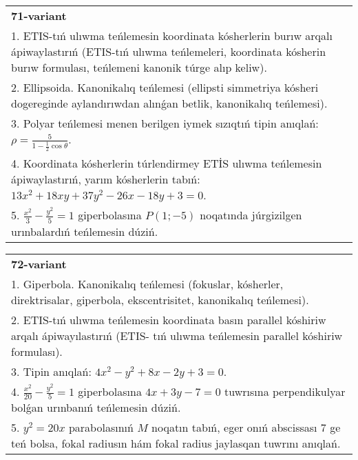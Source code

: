\documentclass{article}
\begin{document}
\begin{tabular}{m{17cm}}
\textbf{71-variant}\\
1. ETIS-tıń ulıwma teńlemesin koordinata kósherlerin burıw arqalı ápiwaylastırıń (ETIS-tıń ulıwma teńlemeleri, koordinata kósherin burıw formulası, teńlemeni kanonik túrge alıp keliw).\\

2. Ellipsoida. Kanonikalıq teńlemesi (ellipsti simmetriya kósheri dogereginde aylandırıwdan alınǵan betlik, kanonikalıq teńlemesi).\\

3. Polyar teńlemesi menen berilgen iymek sızıqtıń tipin anıqlań: $\rho=\frac{5}{1-\frac{1}{2}\cos\theta}$.\\

4. Koordinata kósherlerin túrlendirmey ETİS ulıwma teńlemesin ápiwaylastırıń, yarım kósherlerin tabıń: $13x^{2} + 18xy + 37y^{2} - 26x - 18y + 3 = 0$.  \\

5. $\frac{x^{2}}{3} - \frac{y^{2}}{5} = 1$ giperbolasına $P(1; - 5)$ noqatında júrgizilgen urınbalardıń teńlemesin dúziń.
\end{tabular}
\vspace{1cm}


\begin{tabular}{m{17cm}}
\textbf{72-variant}\\
1. Giperbola. Kanonikalıq teńlemesi (fokuslar, kósherler, direktrisalar, giperbola, ekscentrisitet, kanonikalıq teńlemesi).\\

2. ETIS-tıń ulıwma teńlemesin koordinata basın parallel kóshiriw arqalı ápiwayılastırıń (ETIS- tıń ulıwma teńlemesin parallel kóshiriw formulası).\\

3. Tipin anıqlań: $4 x^{2}-y^{2}+8 x-2 y+3=0$.\\

4. $\frac{x^{2}}{20} - \frac{y^{2}}{5} = 1$ giperbolasına $4x + 3y - 7 = 0$ tuwrısına perpendikulyar bolǵan urınbanıń teńlemesin dúziń.  \\

5. $y^{2} = 20x$ parabolasınıń $M$ noqatın tabıń, eger onıń abscissası 7 ge teń bolsa, fokal radiusın hám fokal radius jaylasqan tuwrını anıqlań.
\end{tabular}
\vspace{1cm}
\end{document}
